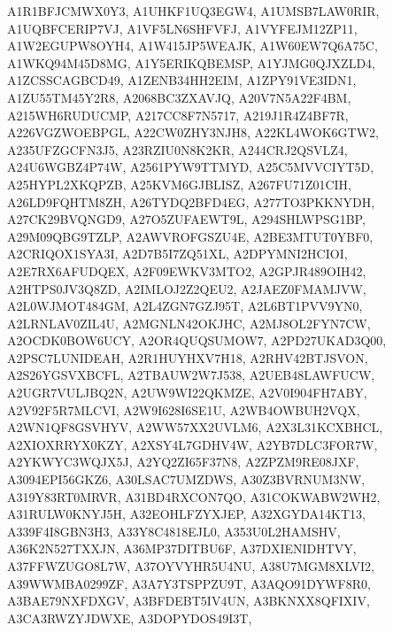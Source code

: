 \begin{itemize}
A1R1BFJCMWX0Y3, A1UHKF1UQ3EGW4, A1UMSB7LAW0RIR,\\ A1UQBFCERIP7VJ, A1VF5LN6SHFVFJ, A1VYFEJM12ZP11,\\ A1W2EGUPW8OYH4, A1W415JP5WEAJK, A1W60EW7Q6A75C,\\ A1WKQ94M45D8MG, A1Y5ERIKQBEMSP, A1YJMG0QJXZLD4,\\ A1ZCSSCAGBCD49, A1ZENB34HH2EIM, A1ZPY91VE3IDN1,\\ A1ZU55TM45Y2R8, A2068BC3ZXAVJQ, A20V7N5A22F4BM,\\ A215WH6RUDUCMP, A217CC8F7N5717, A219J1R4Z4BF7R,\\ A226VGZWOEBPGL, A22CW0ZHY3NJH8, A22KL4WOK6GTW2,\\ A235UFZGCFN3J5, A23RZIU0N8K2KR, A244CRJ2QSVLZ4,\\ A24U6WGBZ4P74W, A2561PYW9TTMYD, A25C5MVVCIYT5D,\\ A25HYPL2XKQPZB, A25KVM6GJBLISZ, A267FU71Z01CIH,\\ A26LD9FQHTM8ZH, A26TYDQ2BFD4EG, A277TO3PKKNYDH,\\ A27CK29BVQNGD9, A27O5ZUFAEWT9L, A294SHLWPSG1BP,\\ A29M09QBG9TZLP, A2AWVROFGSZU4E, A2BE3MTUT0YBF0,\\ A2CRIQOX1SYA3I, A2D7B5I7ZQ51XL, A2DPYMNI2HCIOI,\\ A2E7RX6AFUDQEX, A2F09EWKV3MTO2, A2GPJR489OIH42,\\ A2HTPS0JV3Q8ZD, A2IMLOJ2Z2QEU2, A2JAEZ0FMAMJVW,\\ A2L0WJMOT484GM, A2L4ZGN7GZJ95T, A2L6BT1PVV9YN0,\\ A2LRNLAV0ZIL4U, A2MGNLN42OKJHC, A2MJ8OL2FYN7CW,\\ A2OCDK0BOW6UCY, A2OR4QUQSUMOW7, A2PD27UKAD3Q00,\\ A2PSC7LUNIDEAH, A2R1HUYHXV7H18, A2RHV42BTJSVON,\\ A2S26YGSVXBCFL, A2TBAUW2W7J538, A2UEB48LAWFUCW,\\ A2UGR7VULJBQ2N, A2UW9WI22QKMZE, A2V0I904FH7ABY,\\ A2V92F5R7MLCVI, A2W9I628I6SE1U, A2WB4OWBUH2VQX,\\ A2WN1QF8GSVHYV, A2WW57XX2UVLM6, A2X3L31KCXBHCL,\\ A2XIOXRRYX0KZY, A2XSY4L7GDHV4W, A2YB7DLC3FOR7W,\\ A2YKWYC3WQJX5J, A2YQ2ZI65F37N8, A2ZPZM9RE08JXF,\\ A3094EPI56GKZ6, A30LSAC7UMZDWS, A30Z3BVRNUM3NW,\\ A319Y83RT0MRVR, A31BD4RXCON7QO, A31COKWABW2WH2,\\ A31RULW0KNYJ5H, A32EOHLFZYXJEP, A32XGYDA14KT13,\\ A339F4I8GBN3H3, A33Y8C4818EJL0, A353U0L2HAMSHV,\\ A36K2N527TXXJN, A36MP37DITBU6F, A37DXIENIDHTVY,\\ A37FFWZUGO8L7W, A37OYVYHR5U4NU, A38U7MGM8XLVI2,\\ A39WWMBA0299ZF, A3A7Y3TSPPZU9T, A3AQO91DYWF8R0,\\ A3BAE79NXFDXGV, A3BFDEBT5IV4UN, A3BKNXX8QFIXIV,\\ A3CA3RWZYJDWXE, A3DOPYDOS49I3T, 
\end{itemize}
